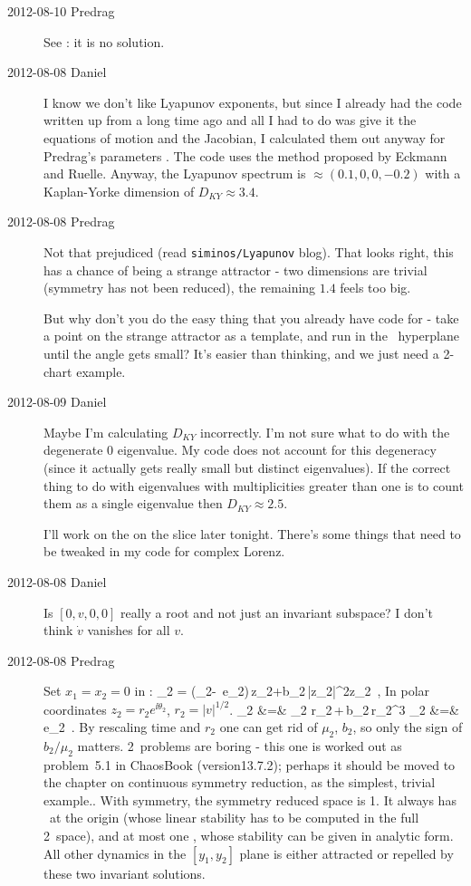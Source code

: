 \begin{description}
\item[2012-08-10 Predrag] See : it is no solution.

\item[2012-08-08 Daniel] I know we don't like Lyapunov exponents, but
since I already had the code written up from a long time ago and all I
had to do was give it the equations of motion and the Jacobian, I
calculated them out anyway for Predrag's parameters
. The code uses the method proposed by Eckmann and
Ruelle. Anyway, the Lyapunov spectrum is $\approx
(0.1,0,0,-0.2)$ with a Kaplan-Yorke dimension of $D_{KY} \approx 3.4$.

\item[2012-08-08 Predrag]
Not that prejudiced (read \texttt{siminos/Lyapunov} blog). That looks
right, this has a chance of being a strange attractor - two dimensions
are trivial (symmetry has not been reduced), the remaining $1.4$ feels
too big.

But why don't you do the easy thing that you already have code for - take
a point on the strange attractor as a template, and run in the \slice\
hyperplane until the angle  gets small? It's easier
than thinking, and we just need a 2-chart example.

\item[2012-08-09 Daniel] Maybe I'm calculating $D_{KY}$ incorrectly. I'm not
sure what to do with the degenerate $0$ eigenvalue. My code does not account
for this degeneracy (since it actually gets really small but distinct eigenvalues).
If the correct thing to do with eigenvalues with multiplicities greater than one
is to count them as a single eigenvalue then $D_{KY} \approx 2.5$.

I'll work on the on the slice later tonight. There's some things that need
to be tweaked in my code for complex Lorenz.

\item[2012-08-08 Daniel]
Is $[0,v,0,0]$ really a root and not just an invariant subspace? I
   don't think $\dot{v}$ vanishes for all $v$.

\item[2012-08-08 Predrag]
Set ${x}_1={x}_2=0$ in :
\beq
  _2 = (\mu_2-\ii\, e_2)\,{z_2}+b_2\,|z_2|^2z_2
\,,
\label{eq:DangSO2sub}
\eeq
In polar coordinates $ {z}_2 =
r_2 e^{\ii\theta_2}$, $r_2 = |v|^{1/2}$.
\bea
{}_2
  &=& \mu_2  {r_2}\,+\,b_2\,r_2^3
\continue
\dot{\theta}_2 &=&  e_2
\,.
\label{eq:DangSO2polar}
\eea
By rescaling time and $r_2$ one can get rid of $\mu_2$, $b_2$, so only
the sign of $b_2/ \mu_2 $ matters. 2\dmn\ problems are boring - this one
is worked out as problem~5.1 in ChaosBook (version13.7.2); perhaps it
should be moved to the chapter on continuous symmetry reduction, as the
simplest, trivial example.. With \SOn{2} symmetry, the symmetry reduced
space is 1\dmn. It always has \eqv\ at the origin (whose linear stability
has to be computed in the full 2\dmn\ space), and at most one \reqv,
whose stability can be given in analytic form. All other dynamics in the
$[{y}_1,{y}_2]$ plane is either attracted or repelled by these two
invariant solutions.


\end{description}
